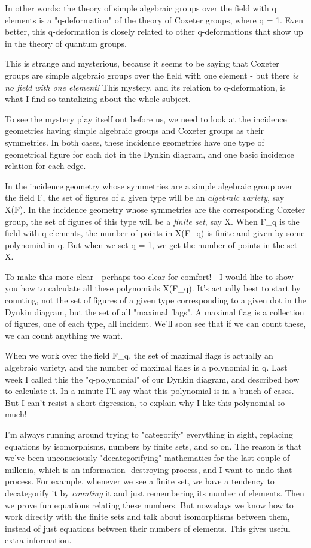 In other words: the theory of simple algebraic groups over the field
with q elements is a "q-deformation" of the theory of Coxeter groups,
where q = 1.  Even better, this q-deformation is closely related to 
other q-deformations that show up in the theory of quantum groups.

This is strange and mysterious, because it seems to be saying that
Coxeter groups are simple algebraic groups over the field with one
element - but there \emph{is no field with one element!}  This mystery, 
and its relation to q-deformation, is what I find so tantalizing 
about the whole subject.  

To see the mystery play itself out before us, we need to look at the
incidence geometries having simple algebraic groups and Coxeter groups
as their symmetries.  In both cases, these incidence geometries have one
type of geometrical figure for each dot in the Dynkin diagram, and one
basic incidence relation for each edge.  

In the incidence geometry whose symmetries are a simple algebraic group
over the field F, the set of figures of a given type will be an
\emph{algebraic variety}, say X(F).  In the incidence geometry whose
symmetries are the corresponding Coxeter group, the set of figures of
this type will be a \emph{finite set}, say X.  When F_{q} is the
field with q elements, the number of points in X(F_{q}) is
finite and given by some polynomial in q.  But when we set q = 1, we get
the number of points in the set X.

To make this more clear - perhaps too clear for comfort! - I would like
to show you how to calculate all these polynomials X(F_{q}).
It's actually best to start by counting, not the set of figures of a
given type corresponding to a given dot in the Dynkin diagram, but the
set of all "maximal flags".  A maximal flag is a collection of
figures, one of each type, all incident.  We'll soon see that if we can
count these, we can count anything we want.

When we work over the field F_{q}, the set of maximal flags is
actually an algebraic variety, and the number of maximal flags is a
polynomial in q.  Last week I called this the "q-polynomial"
of our Dynkin diagram, and described how to calculate it.  In a minute
I'll say what this polynomial is in a bunch of cases.  But I can't
resist a short digression, to explain why I like this polynomial so
much!

I'm always running around trying to "categorify" everything in
sight, replacing equations by isomorphisms, numbers by finite sets, and
so on.  The reason is that we've been unconsciously
"decategorifying" mathematics for the last couple of millenia,
which is an information- destroying process, and I want to undo that
process.  For example, whenever we see a finite set, we have a tendency
to decategorify it by \emph{counting} it and just remembering its number of
elements.  Then we prove fun equations relating these numbers.  But
nowadays we know how to work directly with the finite sets and talk
about isomorphisms between them, instead of just equations between their
numbers of elements.  This gives useful extra information.

